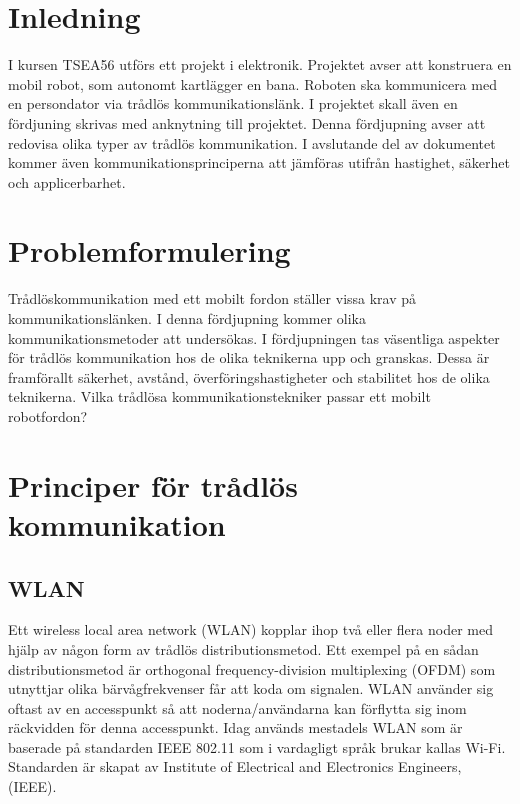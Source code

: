 \documentclass[a4paper,12pt,fleqn]{article}
\begin{document}
\addto\captionsswedish{\renewcommand{\contentsname}{Innehållsförteckning}}

\tableofcontents
\thispagestyle{fancy}
\newpage

\section{Inledning}
I kursen TSEA56 utförs ett projekt i elektronik. Projektet avser att konstruera en mobil robot, som autonomt kartlägger en bana. Roboten ska kommunicera med en persondator via trådlös kommunikationslänk. I projektet skall även en fördjuning skrivas med anknytning till projektet. Denna fördjupning avser att redovisa olika typer av trådlös kommunikation. I avslutande del av dokumentet kommer även kommunikationsprinciperna att jämföras utifrån hastighet, säkerhet och applicerbarhet. 

\section{Problemformulering}
Trådlöskommunikation med ett mobilt fordon ställer vissa krav på kommunikationslänken. I denna fördjupning kommer olika kommunikationsmetoder att undersökas. I fördjupningen tas väsentliga aspekter för trådlös kommunikation hos de olika teknikerna upp och granskas. Dessa är framförallt säkerhet, avstånd, överföringshastigheter och stabilitet hos de olika teknikerna. Vilka trådlösa kommunikationstekniker passar ett mobilt robotfordon?

\section{Principer för trådlös kommunikation}
\subsection{WLAN}
Ett wireless local area network (WLAN) kopplar ihop två eller flera noder med hjälp av någon form av trådlös distributionsmetod. Ett exempel på en sådan distributionsmetod är orthogonal frequency-division multiplexing (OFDM) som utnyttjar olika bärvågfrekvenser får att koda om signalen. WLAN använder sig oftast av en accesspunkt så att noderna/användarna kan förflytta sig inom räckvidden för denna accesspunkt. Idag används mestadels WLAN som är baserade på standarden IEEE 802.11 som i vardagligt språk brukar kallas Wi-Fi. Standarden är skapat av Institute of Electrical and Electronics Engineers, (IEEE).
\end{document}
